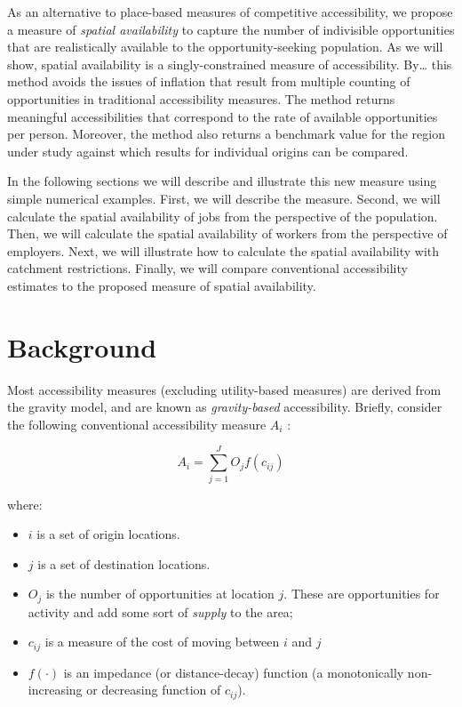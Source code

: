 \documentclass[]{elsarticle} %
\providecommand{\tightlist}{%
  \setlength{\itemsep}{0pt}\setlength{\parskip}{0pt}}
\begin{document}
As an alternative to place-based measures of competitive accessibility,
we propose a measure of \emph{spatial availability} to capture the
number of indivisible opportunities that are realistically available to
the opportunity-seeking population. As we will show, spatial
availability is a singly-constrained measure of accessibility.
By\ldots{} this method avoids the issues of inflation that result from
multiple counting of opportunities in traditional accessibility
measures. The method returns meaningful accessibilities that correspond
to the rate of available opportunities per person. Moreover, the method
also returns a benchmark value for the region under study against which
results for individual origins can be compared.

In the following sections we will describe and illustrate this new
measure using simple numerical examples. First, we will describe the
measure. Second, we will calculate the spatial availability of jobs from
the perspective of the population. Then, we will calculate the spatial
availability of workers from the perspective of employers. Next, we will
illustrate how to calculate the spatial availability with catchment
restrictions. Finally, we will compare conventional accessibility
estimates to the proposed measure of spatial availability.

\hypertarget{background}{%
\section{Background}\label{background}}

Most accessibility measures (excluding utility-based measures) are
derived from the gravity model, and are known as \emph{gravity-based}
accessibility. Briefly, consider the following conventional
accessibility measure \(A_i\) :

\[
A_i = \sum_{j=1}^JO_jf(c_{ij})
\]

\noindent where:

\begin{itemize}
\tightlist
\item
  \(i\) is a set of origin locations.
\item
  \(j\) is a set of destination locations.
\item
  \(O_j\) is the number of opportunities at location \(j\). These are
  opportunities for activity and add some sort of \emph{supply} to the
  area;
\item
  \(c_{ij}\) is a measure of the cost of moving between \(i\) and \(j\)
\item
  \(f(\cdot)\) is an impedance (or distance-decay) function (a
  monotonically non-increasing or decreasing function of \(c_{ij}\)).
\end{itemize}
\end{document}

